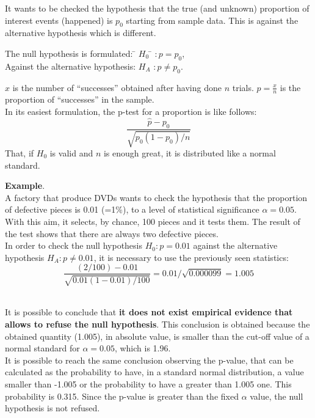 \begin{frame}
  It wants to be checked the hypothesis that the true (and unknown) proportion of interest events (happened) is $ p_0 $ starting from sample data. This is against the alternative hypothesis which is different.\\
  \begin{tabbing}
    The null hypothesis is formulated: \=  $ H_0 $ \= $ :  p = p_0 $,\\
    Against the alternative hypothesis: \>  $ H_A $ \> $ :  p \neq p_0 $.\\
  \end{tabbing}
  \vspace{-0.5cm} 
  $ {x} $ is the number of ``successes'' obtained after having done $ n $ trials. $ \hat{p} = \frac{x}{n} $ is the proportion of ``successes'' in the sample.\\
  In its easiest formulation, the p-test for a proportion is like follows:
  $$ \frac{\hat{p} - p_0}{\sqrt{p_0 (1-p_0) / n}} $$
  That, if $ H_0 $  is valid and $ n $ is enough great, it is distributed like a normal standard.
\end{frame}

\begin{frame}
  \vspace*{.25cm}
  \textbf{Example}.\\
  \vspace{0.25cm}
  A factory that produce DVDs wants to check the hypothesis that the proportion of defective pieces is 0.01 (=1$ \% $), to a level of statistical significance $ \alpha = 0.05 $.\\
  \vspace{0.25cm}
  With this aim, it selects, by chance, 100 pieces and it tests them. The result of the test shows that there are always two defective pieces.\\
  \vspace{0.25cm}
  In order to check the null hypothesis $ H_0: p = 0.01 $ against the alternative hypothesis $ H_A: p \neq 0.01 $, it is necessary to use the previously seen statistics:
  $$ \frac{(2/100) - 0.01}{\sqrt{0.01 (1-0.01) / 100}} = 0.01 / \sqrt{0.000099} = 1.005 $$\
\end{frame}

\begin{frame}
  \vspace{0.25cm}
  It is possible to conclude that \textbf{ it does not exist empirical evidence that allows to refuse the null hypothesis}. This conclusion is obtained because the obtained quantity (1.005), in absolute value, is smaller than the cut-off value of a normal standard for $ \alpha = 0.05 $, which is 1.96.\\ 
  \vspace{0.5cm}
  It is possible to reach the same conclusion observing the p-value, that can be calculated as the probability to have, in a standard normal distribution, a value smaller than -1.005 or the probability to have a greater than 1.005 one. This probability is 0.315. Since the p-value is greater than the fixed $ \alpha $ value, the null hypothesis is not refused.
\end{frame}

